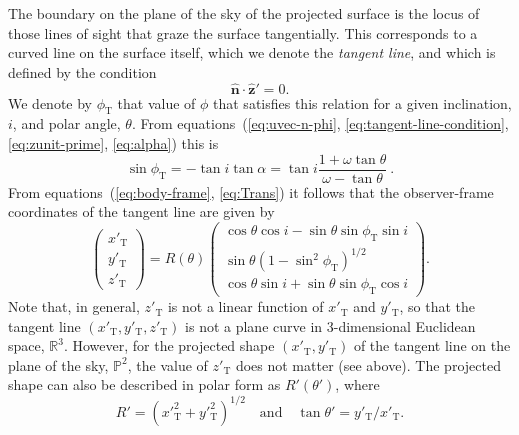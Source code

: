\documentclass[useAMS, usenatbib, a4paper]{mnras}
\newcommand\uvec[1]{\bm{\hat{#1}}}
\newcommand\T{_{\mathrm{\scriptscriptstyle T}}}
\begin{document}
The boundary on the plane of the sky of the projected surface is the
locus of those lines of sight that graze the surface tangentially.
This corresponds to a curved line on the surface itself, which we
denote the \textit{tangent line}, and which is defined by the
condition  
\begin{equation}
  \label{eq:tangent-line-condition}
  \uvec{n} \cdot \uvec{z}' = 0.
\end{equation}
We denote by \(\phi\T\) that value of $\phi$ that satisfies this relation
for a given inclination, \(i\), and polar angle, \(\theta\).  From
equations~(\ref{eq:uvec-n-phi}, \ref{eq:tangent-line-condition},
\ref{eq:zunit-prime}, \ref{eq:alpha}) this is
\begin{equation}
\sin\phi\T = -\tan i\tan\alpha = \tan i \frac{1+\omega\tan\theta}{\omega-\tan\theta} \ .
\label{eq:tanphi}
\end{equation}
From equations~(\ref{eq:body-frame}, \ref{eq:Trans}) it follows that
the observer-frame coordinates of the tangent line are given by
\begin{equation}
\left(\begin{array}{c}
x'\T \\ y'\T \\ z'\T
\end{array}\right)= R(\theta)\left(\begin{array}{c}
\cos\theta\cos i - \sin\theta\sin\phi\T \sin i \\
\sin\theta(1-\sin^2\phi\T)^{1/2} \\
\cos\theta\sin i +\sin\theta\sin\phi\T\cos i
\end{array}\right).
\label{eq:tangential}
\end{equation} 
Note that, in general, \(z'\T\) is not a linear function of \(x'\T\)
and \(y'\T\), so that the tangent line \((x'\T, y'\T, z'\T)\) is not a
plane curve in 3-dimensional Euclidean space, \(\mathds{R}^3\).
However, for the projected shape \((x'\T, y'\T)\) of the tangent line
on the plane of the sky, \(\mathds{P}^2\), the value of \(z'\T\) does
not matter (see above).  The projected shape can also be described in
polar form as \(R'(\theta')\), where
\begin{equation}
  \label{eq:R-prime-theta-prime}
  R' = (x'^2\T+ y'^2\T)^{1/2} 
  \quad \text{and} \quad
  \tan\theta' = y'\T / x'\T.
\end{equation}
\end{document}
